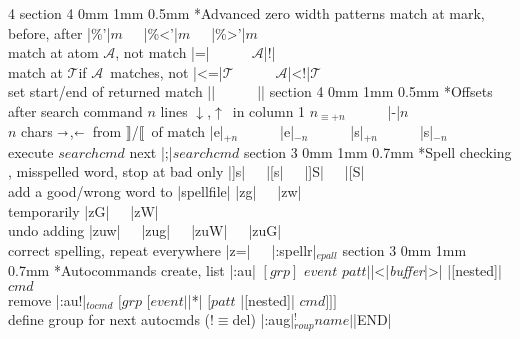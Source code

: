 \documentclass[10pt,a4paper,landscape]{article}
\makeatletter
\renewcommand{\section}{\@startsection		%
	{section}
	{3}
	{0mm}
	{1mm}
	{0.7mm}
	{\normalfont\bfseries\footnotesize}}
\renewcommand{\subsection}{\@startsection
	{section}
	{4}
	{0mm}
	{1mm}
	{0.5mm}
	{\normalfont\bfseries\scriptsize}}
\newcommand{\toleft}{$\shortleftarrow$}
\newcommand{\toright}{$\shortrightarrow$}
\newcommand{\up}{$\uparrow$}
\newcommand{\down}{$\downarrow$}
\newcommand{\ibeg}{$\llbracket$}
\newcommand{\iend}{$\rrbracket$}
\newcommand{\enbeg}[1]{\iend/\ibeg~of #1}
\newcommand{\eqv}[1]{$_{\equiv #1}$}
\newcommand{\opt}[1]{$_{#1}$}
\newcommand{\OPT}[2]{$_{#1}^{#2}$}
\newcommand{\A}{{\footnotesize$\mathcal{A}$}}
\newcommand{\T}{{\footnotesize$\mathcal{T}$}}
\newcommand{\w}{{~~~}}
\newcommand{\IND}{\hspace*{3cm}}
\newcommand{\next}{{\small\leftpointright}}
\newcommand{\prev}{{\small\rightpointleft}}
\makeatother
\begin{document}
\begin{multicols}{4}
\subsection*{Advanced zero width patterns}
match at mark, before, after	    \dotfill|\%'|$m$\w|\%<'|$m$\w|\%>'|$m$\\
match at atom \A, not match	    \dotfill\A|\@=|\w\w\A|\@!|\\
match at \T if \A~matches, not	    \dotfill\A|\@<=|\T\w\w\A|\@<!|\T\\
set start/end of returned match	    \dotfill|\zs|\w\w|\ze|
\subsection*{Offsets after search command}
$n$ lines \down,\up~in column 1	    \dotfill$n$\eqv{+n}\w\w|-|$n$\\
$n$ chars \toright,\toleft~from \enbeg{match}	\dotfill|e|\opt{+n}\w\w|e|\opt{-n}\w\w|s|\opt{+n}\w\w|s|\opt{-n}\\
execute $searchcmd$ next		    \dotfill|;|$searchcmd$
\section*{Spell checking}
\next, \prev misspelled word, stop at bad only	\dotfill|]s|\w|[s|\w|]S|\w|[S|\\
add a good/wrong word to |spellfile|	\dotfill|zg|\w|zw|\\
{\IND}temporarily		    	\dotfill|zG|\w|zW|\\
undo adding				\dotfill|zuw|\w|zug|\w|zuW|\w|zuG|\\
correct spelling, repeat everywhere     \dotfill|z=|\w|:spellr|\opt{epall}
\section*{Autocommands}
create, list	\dotfill|:au| $[grp]$ $event$ $patt{\vert}$|<|\emph{buffer}|>| |[nested]| $cmd$\\
remove	\dotfill|:au!|\opt{tocmd} $[grp$ $[event{\vert}$|*| $[patt$ |[nested]| $cmd]]]$\\
define group for next autocmds (!$\equiv$del)    \dotfill|:aug|\OPT{roup}{!}$name\vert$|END|

\end{multicols}
\end{document}
